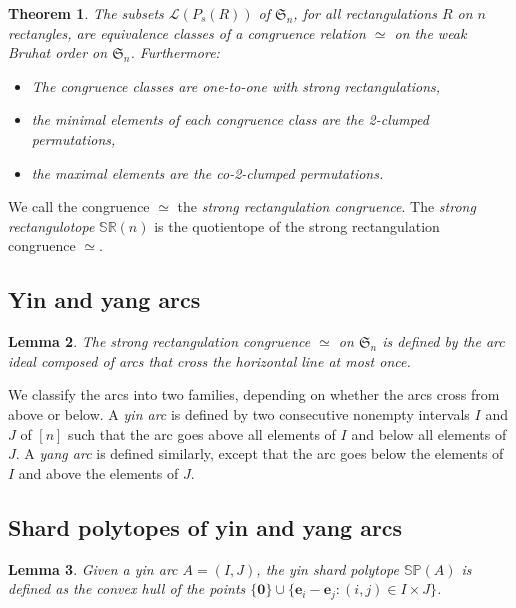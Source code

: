 \documentclass{amsart}
\newtheorem{theorem}{Theorem}%
\newtheorem{lemma}[theorem]{Lemma}
\theoremstyle{definition}
\newcommand{\f}[1]{\mathfrak{#1}} %
\newcommand{\darkblue}{\color{darkblue}} %
\newcommand{\defn}[1]{\textsl{\darkblue #1}} %
\newcommand{\polytope}[1]{\mathds{#1}} %
\newcommand{\SRP}{\polytope{SR}} %
\newcommand{\SP}{\polytope{SP}}
\newcommand{\strongeq}{\simeq}%
\begin{document}
\begin{theorem}
  The subsets $\mathcal{L}(P_s(R))$ of $\f{S}_n$, for all rectangulations $R$ on $n$ rectangles, 
  are equivalence classes of a congruence relation $\strongeq$ on the weak Bruhat order on $\f{S}_n$.
    Furthermore:
  \begin{itemize}
  \item The congruence classes are one-to-one with strong rectangulations,  
  \item the minimal elements of each congruence class are the 2-clumped permutations,
  \item the maximal elements are the co-2-clumped permutations.
  \end{itemize}
\end{theorem}

We call the congruence $\strongeq$ the \defn{strong rectangulation congruence}.
The \defn{strong rectangulotope} $\SRP(n)$ is the quotientope of the strong rectangulation congruence $\strongeq$.

\subsection{Yin and yang arcs}

\begin{lemma}
  The strong rectangulation congruence $\strongeq$ on $\f{S}_n$ is defined by the arc ideal composed of arcs that cross the horizontal line at most once.
\end{lemma}

We classify the arcs into two families, depending on whether the arcs cross from above or below.
A \defn{yin arc} is defined by two consecutive nonempty intervals $I$ and $J$ of $[n]$ such that the arc goes above all elements of $I$ and below all elements of $J$.
A \defn{yang arc} is defined similarly, except that the arc goes below the elements of $I$ and above the elements of $J$. 

\subsection{Shard polytopes of yin and yang arcs}

\begin{lemma}
  \label{lem:yinsp}
  Given a yin arc $A=(I,J)$, the yin shard polytope $\SP(A)$ is defined as the convex hull of the points
  $\{\mathbf{0} \}\cup \{ \mathbf{e}_i - \mathbf{e}_j : (i,j)\in I\times J\}$.
\end{lemma}
\end{document}
